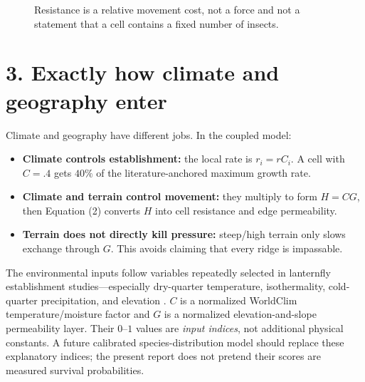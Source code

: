 \documentclass[10pt]{article}
\begin{document}
\begin{figure}[h]
\centering
{}
\caption{Resistance is a relative movement cost, not a force and not a statement that a cell contains a fixed number of insects.}
\label{fig:resistance}
\end{figure}

\newpage
\section*{3. Exactly how climate and geography enter}
Climate and geography have different jobs.  In the coupled model:
\begin{itemize}\setlength\itemsep{1pt}
\item \textbf{Climate controls establishment:} the local rate is $r_i=rC_i$.  A cell with $C=.4$ gets $40\%$ of the literature-anchored maximum growth rate.
\item \textbf{Climate and terrain control movement:} they multiply to form $H=CG$, then Equation (2) converts $H$ into cell resistance and edge permeability.
\item \textbf{Terrain does not directly kill pressure:} steep/high terrain only slows exchange through $G$.  This avoids claiming that every ridge is impassable.
\end{itemize}
The environmental inputs follow variables repeatedly selected in lanternfly establishment studies---especially dry-quarter temperature, isothermality, cold-quarter precipitation, and elevation \citep{wakie2020,zhao2024}.  $C$ is a normalized WorldClim temperature/moisture factor and $G$ is a normalized elevation-and-slope permeability layer.  Their $0$--$1$ values are \emph{input indices}, not additional physical constants.  A future calibrated species-distribution model should replace these explanatory indices; the present report does not pretend their scores are measured survival probabilities.
\end{document}
